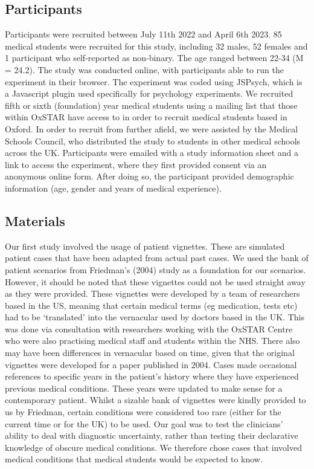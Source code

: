 \documentclass[a4paper, nobind]{templates/ociamthesis}
\begin{document}
\subsection*{Participants}\label{participants}

Participants were recruited between July 11th 2022 and April 6th 2023. 85 medical students were recruited for this study, including 32 males, 52 females and 1 participant who self-reported as non-binary. The age ranged between 22-34 (M = 24.2). The study was conducted online, with participants able to run the experiment in their browser. The experiment was coded using JSPsych, which is a Javascript plugin used specifically for psychology experiments. We recruited fifth or sixth (foundation) year medical students using a mailing list that those within OxSTAR have access to in order to recruit medical students based in Oxford. In order to recruit from further afield, we were assisted by the Medical Schools Council, who distributed the study to students in other medical schools across the UK. Participants were emailed with a study information sheet and a link to access the experiment, where they first provided consent via an anonymous online form. After doing so, the participant provided demographic information (age, gender and years of medical experience).

\subsection*{Materials}\label{materials}

Our first study involved the usage of patient vignettes. These are simulated patient cases that have been adapted from actual past cases. We used the bank of patient scenarios from Friedman's (2004) study as a foundation for our scenarios. However, it should be noted that these vignettes could not be used straight away as they were provided. These vignettes were developed by a team of researchers based in the US, meaning that certain medical terms (eg medication, tests etc) had to be `translated' into the vernacular used by doctors based in the UK. This was done via consultation with researchers working with the OxSTAR Centre who were also practising medical staff and students within the NHS. There also may have been differences in vernacular based on time, given that the original vignettes were developed for a paper published in 2004. Cases made occasional references to specific years in the patient's history where they have experienced previous medical conditions. These years were updated to make sense for a contemporary patient. Whilst a sizable bank of vignettes were kindly provided to us by Friedman, certain conditions were considered too rare (either for the current time or for the UK) to be used. Our goal was to test the clinicians' ability to deal with diagnostic uncertainty, rather than testing their declarative knowledge of obscure medical conditions. We therefore chose cases that involved medical conditions that medical students would be expected to know.
\end{document}
